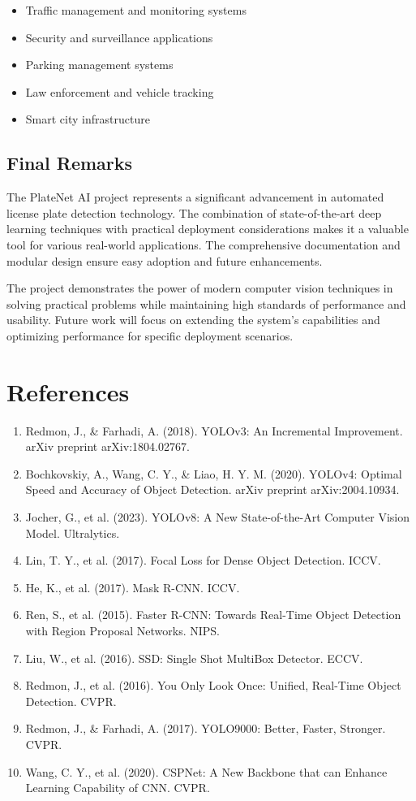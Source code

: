 \documentclass[12pt,a4paper]{article}
\begin{document}
\begin{itemize}
    \item Traffic management and monitoring systems
    \item Security and surveillance applications
    \item Parking management systems
    \item Law enforcement and vehicle tracking
    \item Smart city infrastructure
\end{itemize}

\subsection{Final Remarks}

The PlateNet AI project represents a significant advancement in automated license plate detection technology. The combination of state-of-the-art deep learning techniques with practical deployment considerations makes it a valuable tool for various real-world applications. The comprehensive documentation and modular design ensure easy adoption and future enhancements.

The project demonstrates the power of modern computer vision techniques in solving practical problems while maintaining high standards of performance and usability. Future work will focus on extending the system's capabilities and optimizing performance for specific deployment scenarios.

\section{References}

\begin{enumerate}
    \item Redmon, J., \& Farhadi, A. (2018). YOLOv3: An Incremental Improvement. arXiv preprint arXiv:1804.02767.
    \item Bochkovskiy, A., Wang, C. Y., \& Liao, H. Y. M. (2020). YOLOv4: Optimal Speed and Accuracy of Object Detection. arXiv preprint arXiv:2004.10934.
    \item Jocher, G., et al. (2023). YOLOv8: A New State-of-the-Art Computer Vision Model. Ultralytics.
    \item Lin, T. Y., et al. (2017). Focal Loss for Dense Object Detection. ICCV.
    \item He, K., et al. (2017). Mask R-CNN. ICCV.
    \item Ren, S., et al. (2015). Faster R-CNN: Towards Real-Time Object Detection with Region Proposal Networks. NIPS.
    \item Liu, W., et al. (2016). SSD: Single Shot MultiBox Detector. ECCV.
    \item Redmon, J., et al. (2016). You Only Look Once: Unified, Real-Time Object Detection. CVPR.
    \item Redmon, J., \& Farhadi, A. (2017). YOLO9000: Better, Faster, Stronger. CVPR.
    \item Wang, C. Y., et al. (2020). CSPNet: A New Backbone that can Enhance Learning Capability of CNN. CVPR.
\end{enumerate}
\end{document}
